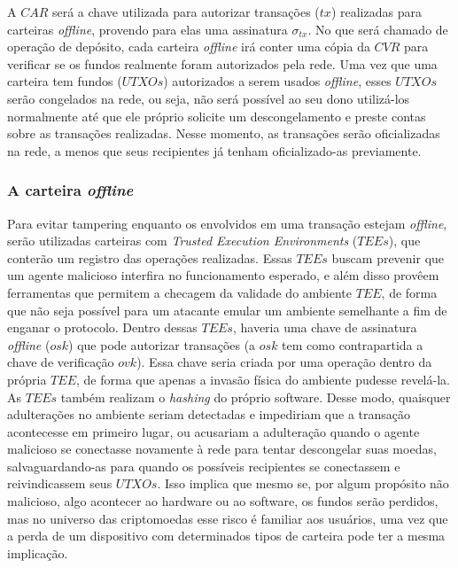 \documentclass[
  12pt,
  a4paper,
  oneside,
  article,
]{abntex2}
\begin{document}
A $CAR$ será a chave utilizada para autorizar transações ($tx$) realizadas para carteiras \textit{offline}, provendo para elas uma assinatura $\sigma_{tx}$. No que será chamado de operação de depósito, cada carteira \textit{offline} irá conter uma cópia da $CVR$ para verificar se os fundos realmente foram autorizados pela rede. Uma vez que uma carteira tem fundos ($UTXOs$) autorizados a serem usados \textit{offline}, esses $UTXOs$ serão congelados na rede, ou seja, não será possível ao seu dono utilizá-los normalmente até que ele próprio solicite um descongelamento e preste contas sobre as transações realizadas. Nesse momento, as transações serão oficializadas na rede, a menos que seus recipientes já tenham oficializado-as previamente.

\subsubsection{A carteira \textit{offline}}

Para evitar tampering enquanto os envolvidos em uma transação estejam \textit{offline}, serão utilizadas carteiras com \textit{Trusted Execution Environments} ($TEEs$), que conterão um registro das operações realizadas. Essas $TEEs$ buscam prevenir que um agente malicioso interfira no funcionamento esperado, e além disso provêem ferramentas que permitem a checagem da validade do ambiente $TEE$, de forma que não seja possível para um atacante emular um ambiente semelhante a fim de enganar o protocolo. Dentro dessas $TEEs$, haveria uma chave de assinatura \textit{offline} ($osk$) que pode autorizar transações (a $osk$ tem como contrapartida a chave de verificação $ovk$). Essa chave seria criada por uma operação dentro da própria $TEE$, de forma que apenas a invasão física do ambiente pudesse revelá-la. As $TEEs$ também realizam o \textit{hashing} do próprio software. Desse modo, quaisquer adulterações no ambiente seriam detectadas e impediriam que a transação acontecesse em primeiro lugar, ou acusariam a adulteração quando o agente malicioso se conectasse novamente à rede para tentar descongelar suas moedas, salvaguardando-as para quando os possíveis recipientes se conectassem e reivindicassem seus $UTXOs$. Isso implica que mesmo se, por algum propósito não malicioso, algo acontecer ao hardware ou ao software, os fundos serão perdidos, mas no universo das criptomoedas esse risco é familiar aos usuários, uma vez que a perda de um dispositivo com determinados tipos de carteira pode ter a mesma implicação.
\end{document}
